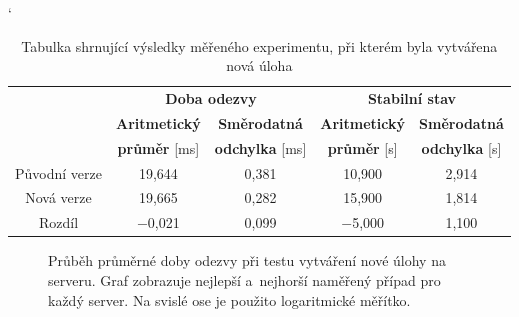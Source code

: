             \begin{table}[ht]
             \catcode`
             \begin{adjustwidth}{-0.5cm}{}
             \begin{center}
              \begin{tabular}{| c || c | c || c | c |} \hline
                \multirow{3}{*}{}  &   \multicolumn{2}{c||}{\textbf{Doba odezvy}}  &  \multicolumn{2}{c|}{\textbf{Stabilní stav}}\\ \cline{2-5}
                 & \textbf{Aritmetický}  &  \textbf{Směrodatná}  &  \textbf{Aritmetický} &  \textbf{Směrodatná}\\ 
                 & \textbf{průměr} [ms]  &  \textbf{odchylka} [ms]  &  \textbf{průměr} [s]  &  \textbf{odchylka} [s]\\ \hline
                Původní verze & 19,644  &  0,381 &  10,900 & 2,914 \\\hline
                Nová verze &  19,665 &  0,282 &  15,900 & 1,814 \\\hline
                Rozdíl & $-$0,021  &  0,099 &  $-$5,000 & 1,100 \\\hline  
              \end{tabular}
              \caption{Tabulka shrnující výsledky měřeného experimentu, při kterém byla vytvářena nová úloha}
              \label{tabCreateFreestyleFinal}
             \end{center}
             \end{adjustwidth}
            \end{table}


            \begin{figure}[h!t]
             \begin{adjustwidth}{-0.5cm}{}
                \begin{center}
                    \caption{Průběh průměrné doby odezvy při testu vytváření nové úlohy na serveru.
                        Graf zobrazuje nejlepší a~nejhorší naměřený případ pro každý server.  
                        Na svislé ose je použito logaritmické měřítko.}
                    \label{imgCreateFreestyleCely}
                \end{center}
             \end{adjustwidth}
            \end{figure}

